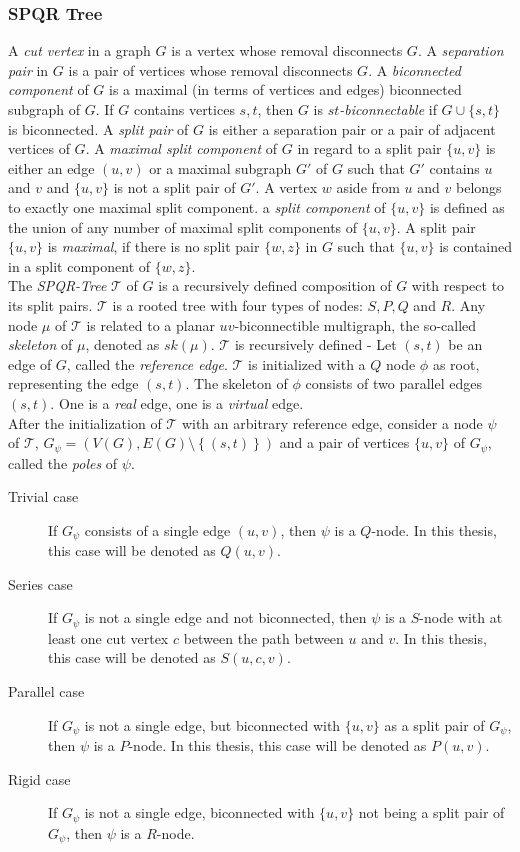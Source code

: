 \subsubsection{SPQR Tree}
A \emph{cut vertex} in a graph $G$ is a vertex whose removal disconnects $G$. A \emph{separation pair} in $G$ is a pair of vertices whose removal disconnects $G$. A \emph{biconnected component} of $G$ is a maximal (in terms of vertices and edges) biconnected subgraph of $G$. If $G$ contains vertices $s,t$, then $G$ is \emph{$st$-biconnectable} if $G \cup \{s,t\}$ is biconnected. A \emph{split pair} of $G$ is either a separation pair or a pair of adjacent vertices of $G$. A \emph{maximal split component} of $G$ in regard to a split pair $\{u,v\}$ is either an edge $(u,v)$ or a maximal subgraph $G'$ of $G$ such that $G'$ contains $u$ and $v$ and $\{u,v\}$ is not a split pair of $G'$. A vertex $w$ aside from $u$ and $v$ belongs to exactly one maximal split component. a \emph{split component} of $\{u,v\}$ is defined as the union of any number of maximal split components of $\{u,v\}$. A split pair $\{u,v\}$ is \emph{maximal}, if there is no split pair $\{w,z\}$ in $G$ such that $\{u,v\}$ is contained in a split component of $\{w,z\}$.\\
The \emph{SPQR-Tree} $\mathcal{T}$ of $G$ is a recursively defined composition of $G$ with respect to its split pairs. $\mathcal{T}$ is a rooted tree with four types of nodes: $S,P,Q$ and $R$. Any node $\mu$ of $\mathcal{T}$ is related to a planar $uv$-biconnectible multigraph, the so-called \emph{skeleton} of $\mu$, denoted as $sk(\mu)$. $\mathcal{T}$ is recursively defined - Let $(s,t)$ be an edge of $G$, called the \emph{reference edge}. $\mathcal{T}$ is initialized with a $Q$ node $\phi$ as root, representing the edge $(s,t)$. The skeleton of $\phi$ consists of two parallel edges $(s,t)$. One is a \emph{real }edge, one is a \emph{virtual }edge.\\
After the initialization of $\mathcal{T}$ with an arbitrary reference edge, consider a node $\psi$ of $\mathcal{T}$, $G_\psi=\left(V(G),E(G)\setminus\left\{(s,t)\right\}\right)$ and a pair of vertices $\{u,v\}$ of $G_\psi$, called the \emph{poles} of $\psi$.

\begin{description}
	\item[Trivial case] If $G_\psi$ consists of a single edge $(u,v)$, then $\psi$ is a $Q$-node. In this thesis, this case will be denoted as $Q(u,v)$.
	\item[Series case] If $G_\psi$ is not a single edge and not biconnected, then $\psi$ is a $S$-node with at least one cut vertex $c$ between the path between $u$ and $v$. In this thesis, this case will be denoted as $S(u,c,v)$.
	\item[Parallel case] If $G_\psi$ is not a single edge, but biconnected with $\{u,v\}$ as a split pair of $G_\psi$, then $\psi$ is a $P$-node. In this thesis, this case will be denoted as $P(u,v)$.
	\item[Rigid case] If $G_\psi$ is not a single edge, biconnected with $\{u,v\}$ not being a split pair of $G_\psi$, then $\psi$ is a $R$-node.
\end{description}
\cite[P. 7-8]{SPQR-Tree}

